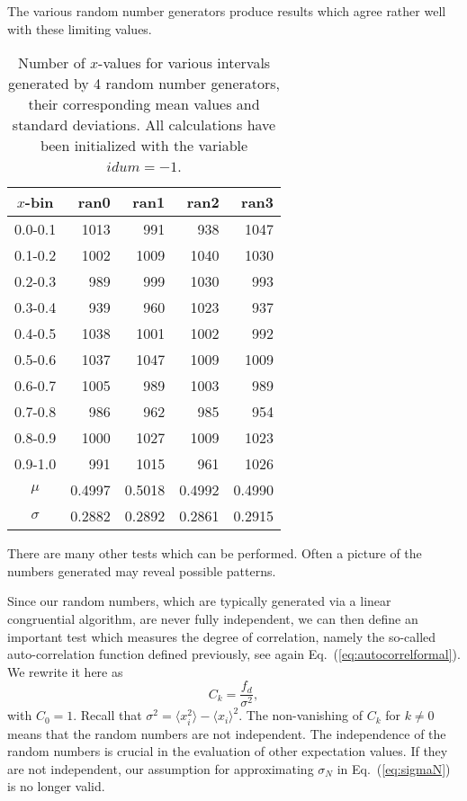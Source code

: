 The various random number generators produce results which agree rather well with
these limiting values. 
\begin{table}[hbtp]
\begin{center}
\caption{Number of $x$-values for various intervals 
generated by 4 random number generators,
their corresponding mean values and standard deviations. All calculations
have been initialized with the variable $idum=-1$.\label{tab:rntest}}
\begin{tabular}{crrrr}\hline
$x$-bin &ran0&ran1&ran2&ran3\\\hline
0.0-0.1 &1013 &991 &938 &1047 \\
0.1-0.2 &1002 &1009 &1040 &1030 \\
0.2-0.3 &989 &999 &1030 &993 \\
0.3-0.4 &939 &960 &1023 &937 \\
0.4-0.5 &1038 &1001 &1002 &992 \\
0.5-0.6 &1037 &1047 &1009 & 1009\\
0.6-0.7 &1005 &989 &1003 &989 \\
0.7-0.8 &986 &962 &985 &954 \\
0.8-0.9 &1000 &1027 &1009 &1023 \\
0.9-1.0 &991 &1015 &961 &1026 \\ \hline
$\mu$ &0.4997 &0.5018 &0.4992 & 0.4990\\
$\sigma$ &0.2882 &0.2892 &0.2861 &0.2915 \\
\hline
\end{tabular} 
\end{center}   
\end{table}     


There are many other tests which can be performed. Often a picture of the numbers
generated may reveal possible patterns. 


Since our random numbers, which are typically generated via a linear congruential algorithm,
are never fully independent, we can then define 
an important test which measures the degree of correlation, namely the  so-called  
auto-correlation function defined previously, see again Eq.~(\ref{eq:autocorrelformal}).
We rewrite it here as
\[
    C_k=\frac{f_d}
             {\sigma^2},
\]
with $C_0=1$. Recall that 
$\sigma^2=\langle x_i^2\rangle-\langle x_i\rangle^2$.
The non-vanishing of $C_k$ for $k\ne 0$ means that the random
numbers are not independent. The independence of the random numbers is crucial 
in the evaluation of other expectation values. If they are not independent, our
assumption for approximating $\sigma_N$ in Eq.~(\ref{eq:sigmaN}) is no longer valid.

